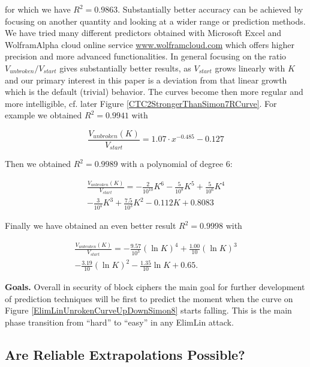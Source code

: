 for which we have $R^2=0.9863$.
Substantially better accuracy can be achieved by focusing on another quantity
and looking at a wider range or prediction methods.
We have tried many different predictors obtained with Microsoft Excel and WolframAlpha cloud
online service \url{www.wolframcloud.com} which offers higher precision and more advanced functionalities.
In general focusing on the ratio $V_{unbroken}/V_{start}$ gives substantially better results,
as $V_{start}$ grows linearly with $K$ and our primary interest in this paper is a deviation
from that linear growth which is the default (trivial) behavior. The curves become then more regular and
more intelligible, cf. later Figure \ref{CTC2StrongerThanSimon7RCurve}.
For example we obtained $R^2=0.9941$ with

\begin{equation}
\frac{V_{unbroken}(K)}{V_{start}}=
1.07 \cdot x^{-0.485} -0.127
\end{equation}


Then we obtained $R^2=0.9989$ with a polynomial of degree 6:

\begin{multline}
\frac{V_{unbroken}(K)}{V_{start}}=
-
\frac{2}{10^{10}}K^6
-
\frac{5}{10^8}K^5
+
\frac{5}{10^6}K^4\\
-
\frac{3}{10^4}K^3
+
\frac{7.5}{10^3}K^2
-
0.112 K
+0.8083
\end{multline}



Finally we have obtained an even better result $R^2=0.9998$ with

\begin{multline}
\frac{V_{unbroken}(K)}{V_{start}}=
-\frac{9.57}{10^3}(\ln K)^4
+\frac{1.00}{10}(\ln K)^3\\
-\frac{3.19}{10}(\ln K)^2
-\frac{1.35}{10}\ln K
+0.65.
\end{multline}


{\bf Goals.}
Overall %
in security of block ciphers
the main goal for further development of prediction techniques
will be first
to predict the moment when the curve on
Figure \ref{ElimLinUnrokenCurveUpDownSimon8} starts falling.
This is the main phase transition from ``hard'' to ``easy'' in any ElimLin attack.

\subsection{Are Reliable Extrapolations Possible?}
\label{BigPictureUpAndDown2}

